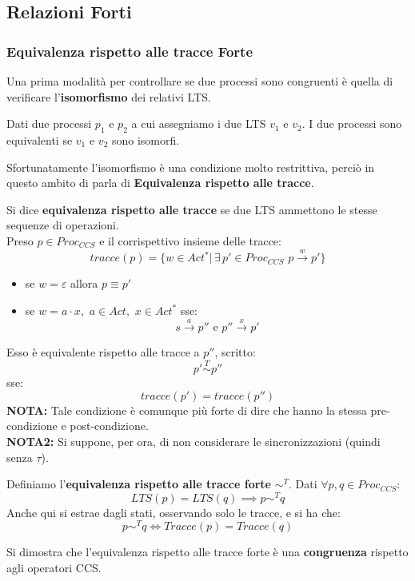 \subsection{Relazioni Forti}
\subsubsection{Equivalenza rispetto alle tracce Forte}
Una prima modalità per controllare se due processi sono congruenti è quella di verificare l'\textbf{isomorfismo} dei relativi LTS.
\begin{definizione}
  Dati due processi $p_1$ e $p_2$ a cui assegniamo i due LTS $v_1$ e $v_2$. I
  due processi sono equivalenti se $v_1$ e $v_2$ sono isomorfi. 
\end{definizione}
Sfortunatamente l'isomorfismo è una condizione molto restrittiva, perciò in questo ambito di parla di \textbf{Equivalenza rispetto alle tracce}.
\begin{definizione}
  Si dice \textbf{equivalenza rispetto alle tracce} se due LTS ammettono le stesse sequenze di operazioni.\\
    Preso $p\in Proc_{CCS}$ e il corrispettivo insieme delle tracce:
  \[tracce(p)=\{w\in Act^*|\,\exists\, p'\in Proc_{CCS}
    \,\, p\stackrel{w}{\rightarrow} p'\}\]
  \begin{itemize}
    \item se $w=\varepsilon$ allora $p\equiv p'$
    \item se $w=a\cdot x,\,\, a\in Act,\,\, x\in Act^*$ sse:
    \[s\stackrel{a}{\rightarrow} p'' \mbox{ e } p''\stackrel{x}{\rightarrow}
      p'\]
  \end{itemize}  
  
  Esso è equivalente rispetto alle tracce a $p''$,  scritto:
  \[p'\stackrel{T}{\sim} p''\]
  sse:
  \[tracce(p')=tracce(p'')\]
  \textbf{NOTA:} Tale condizione è comunque più forte di dire che hanno la stessa pre-condizione e post-condizione. \\
  \textbf{NOTA2: } Si suppone, per ora, di non considerare le sincronizzazioni (quindi senza $\tau$). 
\end{definizione}
\begin{definizione}
  Definiamo l'\textbf{equivalenza rispetto alle tracce forte} $\sim^T$. Dati
  $\forall p, q\in Proc_{CCS}$:
  \[LTS(p)=LTS(q)\implies p\sim^T q\]
  Anche qui si estrae dagli stati, osservando solo le tracce, e si ha che:
  \[p\sim^T q\iff Tracce(p)=Tracce(q)\]
\end{definizione}
\begin{definizione}
  Si dimostra che l'equivalenza rispetto alle tracce forte è una
  \textbf{congruenza} rispetto agli operatori CCS.
\end{definizione}
